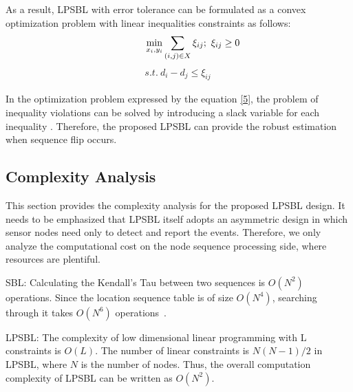 As a result, LPSBL with error tolerance can be formulated as a convex optimization problem with linear inequalities constraints as follows:
 \begin{equation} \label{5}
\quad \quad \quad \mathop {\min }\limits_{{x_i},{y_i}} \sum\limits_{(i,j) \in X} {{\xi _{ij}}};\  \xi _{ij} \ge 0\\
  \end{equation}
  \begin{align*}
 s.t.\   d_i - d_j  \le  \xi _{ij} \
\end{align*}

In the optimization problem expressed by the equation \eqref{5}, the problem of inequality violations can be solved by introducing a slack variable for each inequality \cite{Boyd2004}.
Therefore, the proposed LPSBL can provide the robust estimation when sequence flip occurs.

 
\subsection{Complexity Analysis}
This section provides the complexity analysis for the proposed
LPSBL design. It needs to be emphasized that
LPSBL itself adopts an asymmetric design in which sensor
nodes need only to detect and report the events. Therefore,
we only analyze the computational cost on the node sequence
processing side, where resources are plentiful.

SBL: Calculating the Kendall’s Tau
between two sequences is $O(N^2)$ operations. Since the location sequence table is of size
$O(N^4)$, searching through it takes $O(N^6)$ operations~\cite{yedavalli2008sequence}.

LPSBL: The complexity of low dimensional linear programming
with L constraints is $O(L)$\cite{Griva2009}. The number of linear constraints is $N(N-1)/2$ in LPSBL,
where $N$ is the number of nodes. Thus, the overall computation
complexity of LPSBL can be written as $O(N^2)$.



